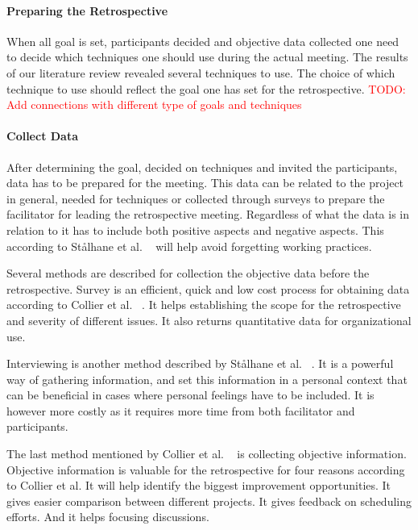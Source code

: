 \documentclass[12pt]{article}
\newcommand\todo[1]{\textcolor{red}{#1}}
\begin{document}
\paragraph{Preparing the Retrospective} \label{subsec:which-techniques}
When all goal is set, participants decided and objective data collected one need to decide which techniques one should use during the actual meeting. The results of our literature review revealed several techniques to use. The choice of which technique to use should reflect the goal one has set for the retrospective. 
\todo{TODO: Add connections with different type of goals and techniques}

\paragraph{Collect Data}
After determining the goal, decided on techniques and invited the participants, data has to be prepared for the meeting. This data can be related to the project in general, needed for techniques or collected through surveys to prepare the facilitator for leading the retrospective meeting. Regardless of what the data is in relation to it has to include both positive aspects and negative aspects. This according to Stålhane et al. ~\cite{Birk2002} will help avoid forgetting working practices. 

Several methods are described for collection the objective data before the retrospective. Survey is an efficient, quick and low cost process for obtaining data according to Collier et al. ~\cite{Collier1996}. It helps establishing the scope for the retrospective and severity of different issues. It also returns quantitative data for organizational use.

Interviewing is another method described by Stålhane et al. ~\cite{Birk2002}. It is a powerful way of gathering information, and set this information in a personal context that can be beneficial in cases where personal feelings have to be included. It is however more costly as it requires more time from both facilitator and participants. 

The last method mentioned by Collier et al. ~\cite{Collier1996} is collecting objective information. Objective information is valuable for the retrospective for four reasons according to Collier et al. It will help identify the biggest improvement opportunities. It gives easier comparison between different projects. It gives feedback on scheduling efforts. And it helps focusing discussions. 
\end{document}
